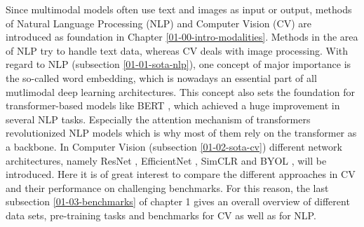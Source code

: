 \documentclass[
]{krantz}
\begin{document}
Since multimodal models often use text and images as input or output, methods of Natural Language Processing (NLP) and Computer Vision (CV) are introduced as foundation in Chapter \ref{01-00-intro-modalities}. Methods in the area of NLP try to handle text data, whereas CV deals with image processing. With regard to NLP (subsection \ref{01-01-sota-nlp}), one concept of major importance is the so-called word embedding, which is nowadays an essential part of all mutlimodal deep learning architectures. This concept also sets the foundation for transformer-based models like BERT \citep{BERT}, which achieved a huge improvement in several NLP tasks. Especially the attention mechanism \citep{attention} of transformers revolutionized NLP models which is why most of them rely on the transformer as a backbone. In Computer Vision (subsection \ref{01-02-sota-cv}) different network architectures, namely ResNet \citep{ResNet}, EfficientNet \citep{EfficientNet}, SimCLR \citep{SimCLR} and BYOL \citep{BYOL}, will be introduced. Here it is of great interest to compare the different approaches in CV and their performance on challenging benchmarks. For this reason, the last subsection \ref{01-03-benchmarks} of chapter 1 gives an overall overview of different data sets, pre-training tasks and benchmarks for CV as well as for NLP.
\end{document}
